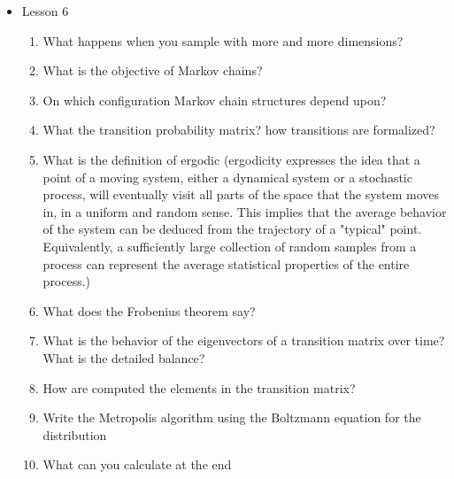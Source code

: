 {\begin{itemize}
\begin{enumerate}
        \item How can you transform a time evolution? and in which condition?
        \item How do time dependent correlation functions behave in time? Write the formula
        \item How would you find in general a quantity A? But what's the problem with the integration process?
        \item What's the idea behind stochastic integration?
        \item How do you write an integration performed by using a uniform distribution?
        \item How can you improve this stochastic sampling?
        \item What's the limit of stochastic sampling? What is the Bulk problem? (topic included also in the next lecture)
    \end{enumerate}
    \item Lesson 6
    \begin{enumerate}
        \item What happens when you sample with more and more dimensions?
        \item What is the objective of Markov chains?
        \item On which configuration Markov chain structures depend upon?
        \item What the transition probability matrix? how transitions are formalized?
        \item What is the definition of ergodic (ergodicity expresses the idea that a point of a moving system, either a dynamical system or a stochastic process, will eventually visit all parts of the space that the system moves in, in a uniform and random sense. This implies that the average behavior of the system can be deduced from the trajectory of a "typical" point. Equivalently, a sufficiently large collection of random samples from a process can represent the average statistical properties of the entire process.)
        \item What does the Frobenius theorem say?
        \item What is the behavior of the eigenvectors of a transition matrix over time? What is the detailed balance?
        \item How are computed the elements in the transition matrix?
        \item Write the Metropolis algorithm using the Boltzmann equation for the distribution
        \item What can you calculate at the end

\end{enumerate}
\end{itemize}}
